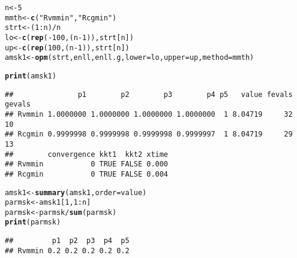 \documentclass[11pt]{article}\usepackage[]{graphicx}\usepackage[]{color}
\makeatletter
\newcommand{\hlnum}[1]{\textcolor[rgb]{0.686,0.059,0.569}{#1}}%
\newcommand{\hlstr}[1]{\textcolor[rgb]{0.192,0.494,0.8}{#1}}%
\newcommand{\hlopt}[1]{\textcolor[rgb]{0,0,0}{#1}}%
\newcommand{\hlstd}[1]{\textcolor[rgb]{0.345,0.345,0.345}{#1}}%
\newcommand{\hlkwb}[1]{\textcolor[rgb]{0.69,0.353,0.396}{#1}}%
\newcommand{\hlkwc}[1]{\textcolor[rgb]{0.333,0.667,0.333}{#1}}%
\newcommand{\hlkwd}[1]{\textcolor[rgb]{0.737,0.353,0.396}{\textbf{#1}}}%
\newenvironment{kframe}{%
 \def\at@end@of@kframe{}%
 \ifinner\ifhmode%
  \def\at@end@of@kframe{\end{minipage}}%
  \begin{minipage}{\columnwidth}%
 \fi\fi%
 \def\FrameCommand##1{\hskip\@totalleftmargin \hskip-\fboxsep
 \colorbox{shadecolor}{##1}\hskip-\fboxsep
     \hskip-\linewidth \hskip-\@totalleftmargin \hskip\columnwidth}%
 \MakeFramed {\advance\hsize-\width
   \@totalleftmargin\z@ \linewidth\hsize
   \@setminipage}}%
 {\par\unskip\endMakeFramed%
 \at@end@of@kframe}
\newenvironment{knitrout}{}{} %
\makeatother
\begin{document}
\begin{knitrout}\scriptsize
{}\color{fgcolor}\begin{kframe}
\begin{alltt}
\hlstd{n}\hlkwb{<-}\hlnum{5}
\hlstd{mmth} \hlkwb{<-} \hlkwd{c}\hlstd{(}\hlstr{"Rvmmin"}\hlstd{,} \hlstr{"Rcgmin"}\hlstd{)}
\hlstd{strt} \hlkwb{<-} \hlstd{(}\hlnum{1}\hlopt{:}\hlstd{n)}\hlopt{/}\hlstd{n}
\hlstd{lo} \hlkwb{<-} \hlkwd{c}\hlstd{(}\hlkwd{rep}\hlstd{(}\hlopt{-}\hlnum{100}\hlstd{, (n}\hlopt{-}\hlnum{1}\hlstd{)),strt[n])}
\hlstd{up} \hlkwb{<-} \hlkwd{c}\hlstd{(}\hlkwd{rep}\hlstd{(}\hlnum{100}\hlstd{, (n}\hlopt{-}\hlnum{1}\hlstd{)),strt[n])}
\hlstd{amsk1} \hlkwb{<-} \hlkwd{opm}\hlstd{(strt, enll, enll.g,} \hlkwc{lower}\hlstd{=lo,} \hlkwc{upper}\hlstd{=up,} \hlkwc{method}\hlstd{=mmth)}
\end{alltt}


{\ttfamily\noindent\color{warningcolor}{\#\# Warning in bmchk(par, lower = lower, upper = upper): Masks (fixed parameters) set by bmchk due to tight bounds. CAUTION!!}}

{\ttfamily\noindent\color{warningcolor}{\#\# Warning in bmchk(par, lower = lower, upper = upper): Masks (fixed parameters) set by bmchk due to tight bounds. CAUTION!!}}

{\ttfamily\noindent\color{warningcolor}{\#\# Warning in bmchk(par, lower = lower, upper = upper): Masks (fixed parameters) set by bmchk due to tight bounds. CAUTION!!}}\begin{alltt}
\hlkwd{print}\hlstd{(amsk1)}
\end{alltt}
\begin{verbatim}
##               p1        p2        p3        p4 p5   value fevals gevals
## Rvmmin 1.0000000 1.0000000 1.0000000 1.0000000  1 8.04719     32     10
## Rcgmin 0.9999998 0.9999998 0.9999998 0.9999997  1 8.04719     29     13
##        convergence kkt1  kkt2 xtime
## Rvmmin           0 TRUE FALSE 0.000
## Rcgmin           0 TRUE FALSE 0.004
\end{verbatim}
\begin{alltt}
\hlstd{amsk1} \hlkwb{<-} \hlkwd{summary}\hlstd{(amsk1,} \hlkwc{order}\hlstd{=value)}
\hlstd{parmsk} \hlkwb{<-} \hlstd{amsk1[}\hlnum{1}\hlstd{,} \hlnum{1}\hlopt{:}\hlstd{n]}
\hlstd{parmsk} \hlkwb{<-} \hlstd{parmsk}\hlopt{/}\hlkwd{sum}\hlstd{(parmsk)}
\hlkwd{print}\hlstd{(parmsk)}
\end{alltt}
\begin{verbatim}
##         p1  p2  p3  p4  p5
## Rvmmin 0.2 0.2 0.2 0.2 0.2
\end{verbatim}
\end{kframe}
\end{knitrout}
\end{document}
